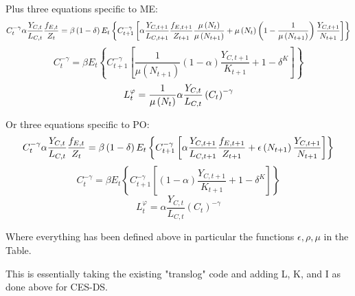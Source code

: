 \documentclass{article}
\begin{document}
Plus three equations specific to ME:%
\[
C_{t}^{-\gamma }\alpha \frac{Y_{C,t}}{L_{C,t}}\frac{f_{E,t}}{Z_{t}}=\beta
\left( 1-\delta \right) E_{t}\left\{ C_{t+1}^{-\gamma }\left[ \alpha \frac{%
Y_{C,t+1}}{L_{C,t+1}}\frac{f_{E,t+1}}{Z_{t+1}}\frac{\mu \left( N_{t}\right) 
}{\mu \left( N_{t+1}\right) }+\mu \left( N_{t}\right) \left( 1-\frac{1}{\mu
\left( N_{t+1}\right) }\right) \frac{Y_{C,t+1}}{N_{t+1}}\right] \right\} 
\]%
\[
C_{t}^{-\gamma }=\beta E_{t}\left\{ C_{t+1}^{-\gamma }\left[ \frac{1}{\mu
\left( N_{t+1}\right) }\left( 1-\alpha \right) \frac{Y_{C,t+1}}{K_{t+1}}%
+1-\delta ^{K}\right] \right\} 
\]%
\begin{equation}
L_{t}^{\varphi }=\frac{1}{\mu \left( N_{t}\right) }\alpha \frac{Y_{C,t}}{%
L_{C,t}}\left( C_{t}\right) ^{-\gamma }
\end{equation}

Or three equations specific to PO: 
\[
C_{t}^{-\gamma }\alpha \frac{Y_{C,t}}{L_{C,t}}\frac{f_{E,t}}{Z_{t}}=\beta
\left( 1-\delta \right) E_{t}\left\{ C_{t+1}^{-\gamma }\left[ \alpha \frac{%
Y_{C,t+1}}{L_{C,t+1}}\frac{f_{E,t+1}}{Z_{t+1}}+\epsilon \left(
N_{t+1}\right) \frac{Y_{C,t+1}}{N_{t+1}}\right] \right\} 
\]%
\[
C_{t}^{-\gamma }=\beta E_{t}\left\{ C_{t+1}^{-\gamma }\left[ \left( 1-\alpha
\right) \frac{Y_{C,t+1}}{K_{t+1}}+1-\delta ^{K}\right] \right\} 
\]%
\begin{equation}
L_{t}^{\varphi }=\alpha \frac{Y_{C,t}}{L_{C,t}}\left( C_{t}\right) ^{-\gamma
}
\end{equation}

Where everything has been defined above in particular the functions $%
\epsilon ,\rho ,\mu $ in the Table. 

This is essentially taking the existing "translog" code and adding L, K, and
I as done above for CES-DS.
\end{document}
